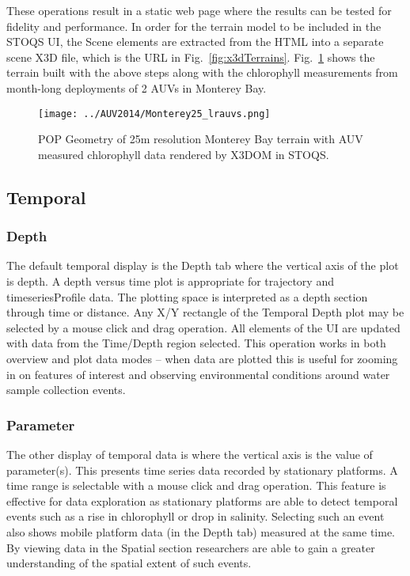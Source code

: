\documentclass[conference]{IEEEtran}
\begin{document}
These operations result in a static web page where the results can be tested for fidelity and performance. In order for the terrain model to be included in the STOQS UI, the Scene elements are extracted from the HTML into a separate scene X3D file, which is the URL in Fig.~\ref{fig:x3dTerrains}. Fig.~\ref{fig:Monterey25_lrauvs} shows the terrain built with the above steps along with the chlorophyll measurements from month-long deployments of 2 AUVs in Monterey Bay.

\begin{figure}[htbp]
\centering
\texttt{[image: ../AUV2014/Monterey25\_lrauvs.png]}
\caption{POP Geometry of 25m resolution Monterey Bay terrain with AUV measured chlorophyll data rendered by X3DOM in STOQS.}
\label{fig:Monterey25_lrauvs}
\end{figure}


\subsection{Temporal}

\subsubsection{Depth}
The default temporal display is the Depth tab where the vertical axis of the plot is depth. A depth versus time plot is appropriate for trajectory and timeseriesProfile data. The plotting space is interpreted as a depth section through time or distance. Any X/Y rectangle of the Temporal Depth plot may be selected by a mouse click and drag operation. All elements of the UI are updated with data from the Time/Depth region selected. This operation works in both overview and plot data modes -- when data are plotted this is useful for zooming in on features of interest and observing environmental conditions around water sample collection events.

\subsubsection{Parameter}
The other display of temporal data is where the vertical axis is the value of parameter(s). This presents time series data recorded by stationary platforms. A time range is selectable with a mouse click and drag operation. This feature is effective for data exploration as stationary platforms are able to detect temporal events such as a rise in chlorophyll or drop in salinity. Selecting such an event also shows mobile platform data (in the Depth tab) measured at the same time. By viewing data in the Spatial section researchers are able to gain a greater understanding of the spatial extent of such events.
\end{document}
